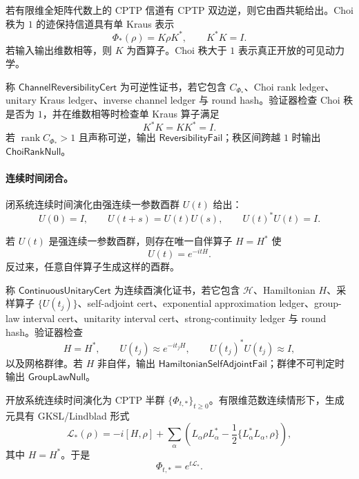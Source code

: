 若有限维全矩阵代数上的 CPTP 信道有 CPTP 双边逆，则它由酉共轭给出。Choi 秩为 \(1\) 的迹保持信道具有单 Kraus 表示
\[
\Phi_{\ast}(\rho)=K\rho K^*,
\qquad
K^*K=I.
\]
若输入输出维数相等，则 \(K\) 为酉算子。Choi 秩大于 \(1\) 表示真正开放的可见动力学。

\begin{definition}[信道可逆性证书]\label{def:typed-address-biaxial-completion-channel-reversibility-cert}
称 \(\mathsf{ChannelReversibilityCert}\) 为可逆性证书，若它包含 \(C_{\Phi_{\ast}}\)、Choi rank ledger、unitary Kraus ledger、inverse channel ledger 与 round hash。验证器检查 Choi 秩是否为 \(1\)，并在维数相等时检查单 Kraus 算子满足
\[
K^*K=KK^*=I.
\]
若 \(\operatorname{rank}C_{\Phi_{\ast}}>1\) 且声称可逆，输出 \(\mathsf{ReversibilityFail}\)；秩区间跨越 \(1\) 时输出 \(\mathsf{ChoiRankNull}\)。
\end{definition}

\paragraph{连续时间闭合。}
闭系统连续时间演化由强连续一参数酉群 \(U(t)\) 给出：
\[
U(0)=I,\qquad
U(t+s)=U(t)U(s),\qquad
U(t)^*U(t)=I.
\]

\begin{theorem}[Stone 定理]\label{thm:typed-address-biaxial-completion-stone-theorem}
若 \(U(t)\) 是强连续一参数酉群，则存在唯一自伴算子 \(H=H^*\) 使
\[
\boxed{
U(t)=e^{-itH}.
}
\]
反过来，任意自伴算子生成这样的酉群。
\end{theorem}

\begin{definition}[连续酉演化证书]\label{def:typed-address-biaxial-completion-continuous-unitary-cert}
称 \(\mathsf{ContinuousUnitaryCert}\) 为连续酉演化证书，若它包含 \(\mathcal H\)、Hamiltonian \(H\)、采样算子 \(\{U(t_j)\}\)、self-adjoint cert、exponential approximation ledger、group-law interval cert、unitarity interval cert、strong-continuity ledger 与 round hash。验证器检查
\[
H=H^*,
\qquad
U(t_j)\approx e^{-it_jH},
\qquad
U(t_j)^*U(t_j)\approx I,
\]
以及网格群律。若 \(H\) 非自伴，输出 \(\mathsf{HamiltonianSelfAdjointFail}\)；群律不可判定时输出 \(\mathsf{GroupLawNull}\)。
\end{definition}

开放系统连续时间演化为 CPTP 半群 \(\{\Phi_{t,\ast}\}_{t\ge0}\)。有限维范数连续情形下，生成元具有 GKSL/Lindblad 形式
\[
\boxed{
\mathcal L_{\ast}(\rho)
=
-i[H,\rho]
+
\sum_\alpha
\left(
L_\alpha\rho L_\alpha^*
-
\frac12\{L_\alpha^*L_\alpha,\rho\}
\right),
}
\]
其中 \(H=H^*\)。于是
\[
\Phi_{t,\ast}=e^{t\mathcal L_{\ast}}.
\]

